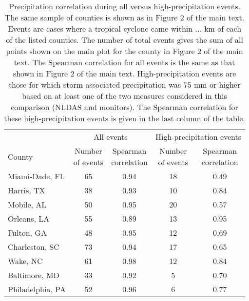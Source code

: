 \begin{table}

\caption{\label{tab:highprecipcorr}Precipitation correlation during all versus high-precipitation events.
                     The same sample of counties is shown as in Figure 2 of the main text.
                     Events are cases where a tropical cyclone came within ... km of each of the 
                     listed counties. The number of total events gives the sum of all points
                     shown on the main plot for the county in Figure 2 of the main text. 
                     The Spearman correlation for all events is the same as that shown in Figure 2
                     of the main text. High-precipitation events are those for which storm-associated
                     precipitation was 75 mm or higher based on at least one of the two measures
                     considered in this comparison (NLDAS and monitors). The Spearman correlation
                     for these high-precipitation events is given in the last column of the 
                     table.}
\centering
\begin{tabular}[t]{lcccc}
\toprule
\multicolumn{1}{c}{ } & \multicolumn{2}{c}{All events} & \multicolumn{2}{c}{High-precipitation events} \\
\cmidrule(l{3pt}r{3pt}){2-3} \cmidrule(l{3pt}r{3pt}){4-5}
County & \makecell[c]{Number\\of events} & \makecell[c]{Spearman\\correlation} & \makecell[c]{Number\\of events} & \makecell[c]{Spearman\\correlation}\\
\midrule
Miami-Dade, FL & 65 & 0.94 & 18 & 0.49\\
Harris, TX & 38 & 0.93 & 10 & 0.84\\
Mobile, AL & 50 & 0.95 & 20 & 0.57\\
Orleans, LA & 55 & 0.89 & 13 & 0.95\\
Fulton, GA & 48 & 0.95 & 12 & 0.69\\
\addlinespace
Charleston, SC & 73 & 0.94 & 17 & 0.65\\
Wake, NC & 61 & 0.98 & 12 & 0.84\\
Baltimore, MD & 33 & 0.92 & 5 & 0.70\\
Philadelphia, PA & 52 & 0.96 & 6 & 0.77\\
\bottomrule
\end{tabular}
\end{table}
